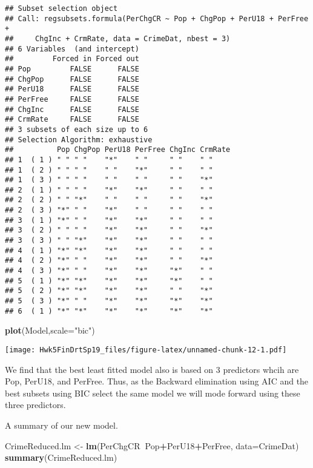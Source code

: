 \documentclass[]{article}
\newenvironment{Shaded}{\begin{snugshade}}{\end{snugshade}}
\newcommand{\KeywordTok}[1]{\textcolor[rgb]{0.13,0.29,0.53}{\textbf{#1}}}
\newcommand{\DataTypeTok}[1]{\textcolor[rgb]{0.13,0.29,0.53}{#1}}
\newcommand{\StringTok}[1]{\textcolor[rgb]{0.31,0.60,0.02}{#1}}
\newcommand{\OperatorTok}[1]{\textcolor[rgb]{0.81,0.36,0.00}{\textbf{#1}}}
\newcommand{\NormalTok}[1]{#1}
\begin{document}
\begin{verbatim}
## Subset selection object
## Call: regsubsets.formula(PerChgCR ~ Pop + ChgPop + PerU18 + PerFree + 
##     ChgInc + CrmRate, data = CrimeDat, nbest = 3)
## 6 Variables  (and intercept)
##         Forced in Forced out
## Pop         FALSE      FALSE
## ChgPop      FALSE      FALSE
## PerU18      FALSE      FALSE
## PerFree     FALSE      FALSE
## ChgInc      FALSE      FALSE
## CrmRate     FALSE      FALSE
## 3 subsets of each size up to 6
## Selection Algorithm: exhaustive
##          Pop ChgPop PerU18 PerFree ChgInc CrmRate
## 1  ( 1 ) " " " "    "*"    " "     " "    " "    
## 1  ( 2 ) " " " "    " "    "*"     " "    " "    
## 1  ( 3 ) " " " "    " "    " "     " "    "*"    
## 2  ( 1 ) " " " "    "*"    "*"     " "    " "    
## 2  ( 2 ) " " "*"    " "    " "     " "    "*"    
## 2  ( 3 ) "*" " "    "*"    " "     " "    " "    
## 3  ( 1 ) "*" " "    "*"    "*"     " "    " "    
## 3  ( 2 ) " " " "    "*"    "*"     " "    "*"    
## 3  ( 3 ) " " "*"    "*"    "*"     " "    " "    
## 4  ( 1 ) "*" "*"    "*"    "*"     " "    " "    
## 4  ( 2 ) "*" " "    "*"    "*"     " "    "*"    
## 4  ( 3 ) "*" " "    "*"    "*"     "*"    " "    
## 5  ( 1 ) "*" "*"    "*"    "*"     "*"    " "    
## 5  ( 2 ) "*" "*"    "*"    "*"     " "    "*"    
## 5  ( 3 ) "*" " "    "*"    "*"     "*"    "*"    
## 6  ( 1 ) "*" "*"    "*"    "*"     "*"    "*"
\end{verbatim}

\begin{Shaded}
\begin{Highlighting}[]
\KeywordTok{plot}\NormalTok{(Model,}\DataTypeTok{scale=}\StringTok{"bic"}\NormalTok{)}
\end{Highlighting}
\end{Shaded}

\texttt{[image: Hwk5FinDrtSp19\_files/figure-latex/unnamed-chunk-12-1.pdf]}

We find that the best least fitted model also is based on 3 predictors
whcih are Pop, PerU18, and PerFree. Thus, as the Backward elimination
using AIC and the best subsets using BIC select the same model we will
mode forward using these three predictors.

A summary of our new model.

\begin{Shaded}
\begin{Highlighting}[]
\NormalTok{CrimeReduced.lm <-}\StringTok{ }\KeywordTok{lm}\NormalTok{(PerChgCR}\OperatorTok{~}\NormalTok{Pop}\OperatorTok{+}\NormalTok{PerU18}\OperatorTok{+}\NormalTok{PerFree, }\DataTypeTok{data=}\NormalTok{CrimeDat)}
\KeywordTok{summary}\NormalTok{(CrimeReduced.lm) }
\end{Highlighting}
\end{Shaded}
\end{document}
